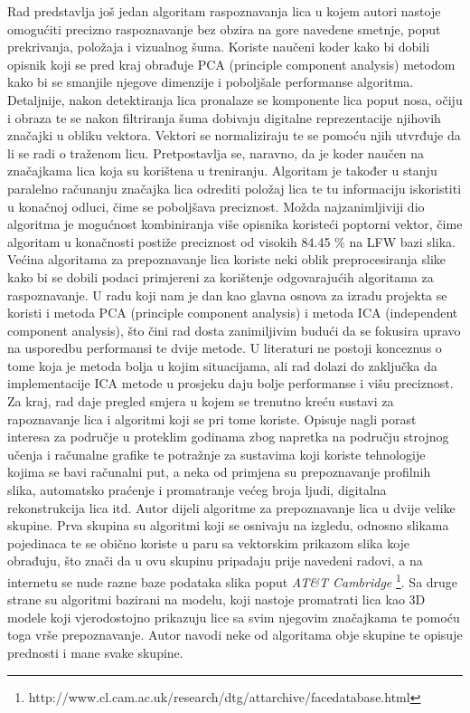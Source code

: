 \documentclass[times, utf8, seminar, numeric]{fer}
\begin{document}
Rad \cite{5539992} predstavlja još jedan algoritam raspoznavanja lica u kojem autori nastoje omogućiti precizno raspoznavanje bez obzira na gore navedene smetnje, poput prekrivanja, položaja i vizualnog šuma. Koriste naučeni koder kako bi dobili opisnik koji se pred kraj obrađuje PCA (principle component analysis) metodom kako bi se smanjile njegove dimenzije i poboljšale performanse algoritma.   Detaljnije, nakon detektiranja lica pronalaze se komponente lica poput nosa, očiju i obraza te se nakon filtriranja šuma dobivaju digitalne reprezentacije njihovih značajki u obliku vektora. Vektori se normaliziraju te se pomoću njih utvrđuje da li se radi o traženom licu. Pretpostavlja se, naravno, da je koder naučen na značajkama lica koja su korištena u treniranju. Algoritam je također u stanju paralelno računanju značajka lica odrediti položaj lica te tu informaciju iskoristiti u konačnoj odluci, čime se poboljšava preciznost. Možda najzanimljiviji dio algoritma je mogućnost kombiniranja više opisnika koristeći poptorni vektor, čime algoritam u konačnosti postiže preciznost od visokih 84.45 \% na LFW \cite{Huang_labeledfaces} bazi slika.
Većina algoritama za prepoznavanje lica koriste neki oblik preprocesiranja slike kako bi se dobili podaci primjereni za korištenje odgovarajućih algoritama za raspoznavanje. U radu koji nam je dan kao glavna osnova za izradu projekta se koristi i metoda PCA (principle component analysis) i metoda ICA (independent component analysis), što čini rad \cite{Draper:2003:RFP:950135.950141} dosta zanimiljivim budući da se fokusira upravo na usporedbu performansi te dvije metode. U literaturi ne postoji konceznus o tome koja je metoda bolja u kojim situacijama, ali rad dolazi do zaključka da implementacije ICA metode u prosjeku daju bolje performanse i višu preciznost.
Za kraj, rad \cite{Lu_imageanalysis} daje pregled smjera u kojem se trenutno kreću sustavi za rapoznavanje lica i algoritmi koji se pri tome koriste. Opisuje nagli porast interesa za područje u proteklim godinama zbog napretka na području strojnog učenja i računalne grafike te potražnje za sustavima koji koriste tehnologije kojima se bavi računalni put, a neka od primjena su prepoznavanje profilnih slika, automatsko praćenje i promatranje većeg broja ljudi, digitalna rekonstrukcija lica itd. Autor dijeli algoritme za prepoznavanje lica u dvije velike skupine. Prva skupina su algoritmi koji se osnivaju na izgledu, odnosno slikama pojedinaca te se obično koriste u paru sa vektorskim prikazom slika koje obrađuju, što znači da u ovu skupinu pripadaju prije navedeni radovi, a na internetu se nude razne baze podataka slika poput \textit{AT\&T Cambridge} \footnote{http://www.cl.cam.ac.uk/research/dtg/attarchive/facedatabase.html}. Sa druge strane su algoritmi bazirani na modelu, koji nastoje promatrati lica kao 3D modele koji vjerodostojno prikazuju lice sa svim njegovim značajkama te pomoću toga vrše prepoznavanje. Autor navodi neke od algoritama obje skupine te opisuje prednosti i mane svake skupine.
\end{document}
